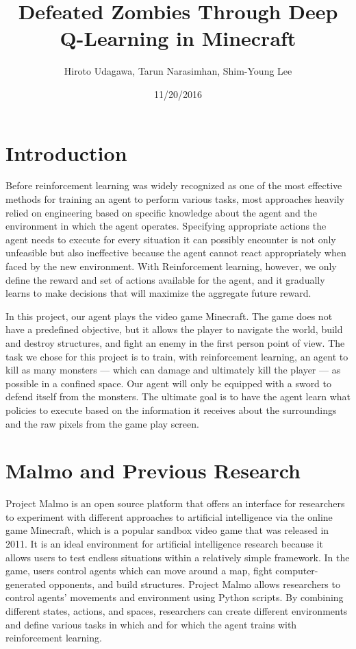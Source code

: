 \documentclass{article}
\title{Defeated Zombies Through Deep Q-Learning in Minecraft}
\author{Hiroto Udagawa, Tarun Narasimhan, Shim-Young Lee}
\date{11/20/2016}
\begin{document}
\maketitle

\section{Introduction}

Before reinforcement learning was widely recognized as one of the most effective methods for training an agent to perform various tasks, most approaches heavily relied on engineering based on specific knowledge about the agent and the environment in which the agent operates. Specifying appropriate actions the agent needs to execute for every situation it can possibly encounter is not only unfeasible but also ineffective because the agent cannot react appropriately when faced by the new environment. With Reinforcement learning, however, we only define the reward and set of actions available for the agent, and it gradually learns to make decisions that will maximize the aggregate future reward.

In this project, our agent plays the video game Minecraft. The game does not have a predefined objective, but it allows the player to navigate the world, build and destroy structures, and fight an enemy in the first person point of view. The task we chose for this project is to train, with reinforcement learning, an agent to kill as many monsters — which can damage and ultimately kill the player — as possible in a confined space. Our agent will only be equipped with a sword to defend itself from the monsters. The ultimate goal is to have the agent learn what policies to execute based on the information it receives about the surroundings and the raw pixels from the game play screen.

\section{Malmo and Previous Research}

Project Malmo is an open source platform that offers an interface for researchers to experiment with different approaches to artificial intelligence via the online game Minecraft, which is a popular sandbox video game that was released in 2011. It is an ideal environment for artificial intelligence research because it allows users to test endless situations within a relatively simple framework. In the game, users control agents which can move around a map, fight computer-generated opponents, and build structures. Project Malmo allows researchers to control agents' movements and environment using Python scripts. By combining different states, actions, and spaces, researchers can create different environments and define various tasks in which and for which the agent trains with reinforcement learning.
\end{document}
